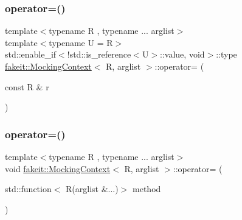 \subsubsection{\texorpdfstring{operator=()}{operator=()}\hspace{0.1cm}{\footnotesize\ttfamily [14/27]}}
{\footnotesize\ttfamily template$<$typename R , typename ... arglist$>$ \\
template$<$typename U  = R$>$ \\
std\+::enable\+\_\+if$<$!std\+::is\+\_\+reference$<$U$>$\+::value, void$>$\+::type \mbox{\hyperlink{classfakeit_1_1MockingContext}{fakeit\+::\+Mocking\+Context}}$<$ R, arglist $>$\+::operator= (\begin{DoxyParamCaption}\item[{const R \&}]{r }\end{DoxyParamCaption})\hspace{0.3cm}{\ttfamily [inline]}}

\mbox{\label{classfakeit_1_1MockingContext_aadefb2bd6c1dee1f3aa8902277dd3fc2}} 
\subsubsection{\texorpdfstring{operator=()}{operator=()}\hspace{0.1cm}{\footnotesize\ttfamily [15/27]}}
{\footnotesize\ttfamily template$<$typename R , typename ... arglist$>$ \\
void \mbox{\hyperlink{classfakeit_1_1MockingContext}{fakeit\+::\+Mocking\+Context}}$<$ R, arglist $>$\+::operator= (\begin{DoxyParamCaption}\item[{std\+::function$<$ R(arglist \&...)$>$}]{method }\end{DoxyParamCaption})\hspace{0.3cm}{\ttfamily [inline]}}

\mbox{\label{classfakeit_1_1MockingContext_aadefb2bd6c1dee1f3aa8902277dd3fc2}} 
